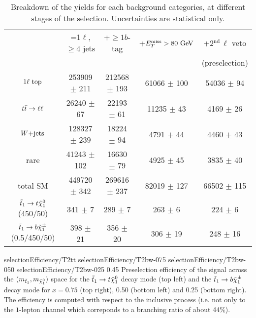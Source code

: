         \begin{table}[h!]
            \hspace*{-0.3cm}
            \begin{tabular}{|c|cccc|}
                \hline
                                             & =1$\ell$, $\geq 4$ jets   & +$\geq 1b$-tag     & +$E_T^\text{miss} > 80 ~\text{GeV}$ &  +2$^\text{nd}\, \ell$ veto \\
                                             &                           &                    &                   & (preselection) \\
                \hline
                $1\ell~\text{top}$              & 253909 $\pm$ 211          & 212568 $\pm$ 193   &  61066 $\pm$ 100  & 54036 $\pm$ 94     \\
                $t\bar{t} \rightarrow \ell \ell$               &  26240 $\pm$ 67           &  22193 $\pm$ 61    &  11235 $\pm$ 43   &  4169 $\pm$ 26     \\
                $\text{$W$+jets}$                     & 128327 $\pm$ 239          &  18224 $\pm$ 94    &   4791 $\pm$ 44   &  4460 $\pm$ 43     \\
                rare                         &  41243 $\pm$ 102          &  16630 $\pm$ 79    &   4925 $\pm$ 45   &  3835 $\pm$ 40     \\
                \hline
                total SM                     & 449720 $\pm$ 342          & 269616 $\pm$ 237   &  82019 $\pm$ 127  & 66502 $\pm$ 115    \\
                \hline
$\tilde{t}_1 \rightarrow t \tilde{\chi}_1^0$   (450/50) & 341 $\pm$ 7               & 289 $\pm$ 7        & 263 $\pm$ 6       & 224 $\pm$ 6        \\
$\tilde{t}_1 \rightarrow b \tilde{\chi}_1^\pm$ (0.5/450/50) & 398 $\pm$ 21              & 356 $\pm$ 20       & 306 $\pm$ 19      & 248 $\pm$ 16       \\
                \hline
            \end{tabular}
            \caption{Breakdown of the yields for each background categories, at different stages of the selection. Uncertainties are statistical only.}
            \label{tab:cutflowPreselection}
        \end{table}

                          {selectionEfficiency/T2tt}
                          {selectionEfficiency/T2bw-075}
                          {selectionEfficiency/T2bw-050}
                          {selectionEfficiency/T2bw-025}
                          {0.45}
                          {Preselection efficiency of the signal across the $(m_{\tilde{t}_1},
                          m_{\tilde{\chi}_1^0})$ space for the $\tilde{t}_1 \rightarrow t \tilde{\chi}_1^0$
                          decay mode (top left) and the $\tilde{t}_1 \rightarrow b \tilde{\chi}_1^\pm$
                          decay mode for $x = 0.75$ (top right), 0.50 (bottom left) and 0.25
                          (bottom right). The efficiency is computed with respect to the
                          inclusive process (i.e. not only to the $1$-lepton channel which
                          correponds to a branching ratio of about 44\%).}


